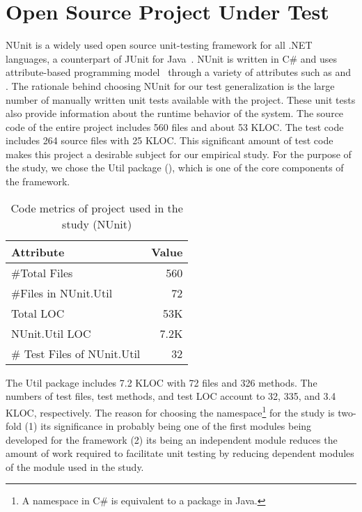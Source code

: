 \section{Open Source Project Under Test} 
\label{sec:opensource}

NUnit is a widely used open source unit-testing framework for all .NET languages, a counterpart of JUnit for Java~\cite{nunit}. NUnit is written in C\# and uses attribute-based programming model~\cite{TDD} 
through a variety of attributes such as \CodeIn{[TestFixture]} and \CodeIn{[Test]}.
The rationale behind choosing NUnit for our test generalization is the large number of manually written unit tests available with the project. These unit tests also provide information about the runtime behavior of the system. The source code of the entire project includes 560 files and about 53 KLOC. The test code includes 264 source files with 25 KLOC.
This significant amount of test code makes this project a desirable subject
for our empirical study. For the purpose of the study, 
we chose the Util package (), which is one of the core components of the framework.
\setlength{\tabcolsep}{3pt}
\begin{table}[t]
\begin{center}
\centering
\begin{tabular}{|l|r|}
\hline
\textbf{Attribute} & \textbf{Value} \\
\hline
\#Total Files & 560\\
\hline
\#Files in NUnit.Util & 72\\
\hline
Total LOC & 53K\\
\hline
NUnit.Util LOC & 7.2K\\
\hline
\# Test Files of NUnit.Util & 32\\
\hline
\end{tabular}
\end{center}
\caption{Code metrics of project used in the study (NUnit)\label{tab:utilmetrics}}
\end{table}

The Util package includes 7.2 KLOC with 72 files and 326 methods. 
The numbers of test files, test methods, and test LOC account to 32, 335, and 3.4 KLOC, respectively. 
The reason for choosing the  namespace\footnote{A namespace in C\# is equivalent to a package in Java.} for the study is two-fold (1) its significance in probably being one of the first modules being developed for the framework (2) its being an independent module reduces the amount of work required to facilitate unit testing by reducing dependent modules of the module used in the study.

